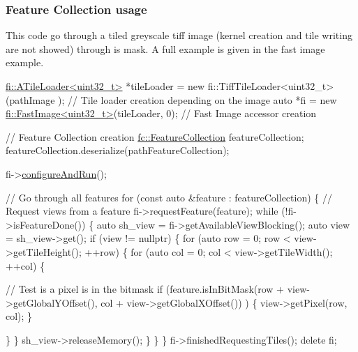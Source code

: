 \subsubsection*{Feature Collection usage}

This code go through a tiled greyscale tiff image (kernel creation and tile writing are not showed) through is mask. A full example is given in the fast image example. 
\begin{DoxyCode}
\hyperlink{classfi_1_1ATileLoader}{fi::ATileLoader<uint32\_t>} *tileLoader = \textcolor{keyword}{new} fi::TiffTileLoader<uint32\_t>(pathImage
      ); \textcolor{comment}{// Tile loader creation depending on the image}
\textcolor{keyword}{auto} *fi = \textcolor{keyword}{new} \hyperlink{classfi_1_1FastImage}{fi::FastImage<uint32\_t>}(tileLoader, 0); \textcolor{comment}{// Fast Image accessor
       creation}

\textcolor{comment}{// Feature Collection creation }
\hyperlink{classfc_1_1FeatureCollection}{fc::FeatureCollection} featureCollection;
featureCollection.deserialize(pathFeatureCollection);

fi->\hyperlink{classfi_1_1FastImage_aa2ae5e5498f57462abd876108a55475c}{configureAndRun}();

\textcolor{comment}{// Go through all features}
\textcolor{keywordflow}{for} (\textcolor{keyword}{const} \textcolor{keyword}{auto} &feature : featureCollection) \{
    \textcolor{comment}{// Request views from a feature}
    fi->requestFeature(feature);
    \textcolor{keywordflow}{while} (!fi->isFeatureDone()) \{
        \textcolor{keyword}{auto} sh\_view = fi->getAvailableViewBlocking();
        \textcolor{keyword}{auto} view = sh\_view->get();
        \textcolor{keywordflow}{if} (view != \textcolor{keyword}{nullptr}) \{
            \textcolor{keywordflow}{for} (\textcolor{keyword}{auto} row = 0; row < view->getTileHeight(); ++row) \{
                \textcolor{keywordflow}{for} (\textcolor{keyword}{auto} col = 0; col < view->getTileWidth(); ++col) \{

                    \textcolor{comment}{// Test is a pixel is in the bitmask}
                    \textcolor{keywordflow}{if} (feature.isInBitMask(row + view->getGlobalYOffset(), col + view->getGlobalXOffset())
      ) \{
                        view->getPixel(row, col);
                    \}

                \}
            \}
            sh\_view->releaseMemory();
        \}
    \}
\}
fi->finishedRequestingTiles();
\textcolor{keyword}{delete} fi;
\end{DoxyCode}


